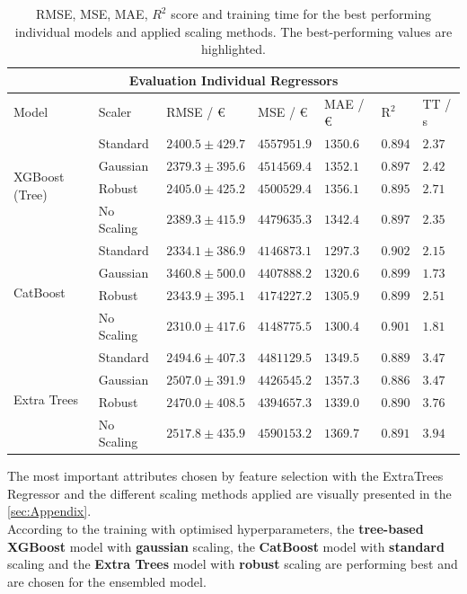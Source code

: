 \begin{table}[h!]
    \centering
      \begin{tabular}{ |p{2cm}||p{2cm}||p{2.9cm}|p{1.9cm}|p{1.7cm}|p{1cm}|p{1.2cm}|  }
        \hline
        \multicolumn{7}{|c|}{Evaluation Individual Regressors} \\
        \hline
        Model & Scaler & RMSE / €  & MSE / €  & MAE / € & $ \mathrm{R}^2 $& TT / s\\
        \hline
        \multirow{4}{2cm}{XGBoost (Tree)} & Standard & $2400.5 \pm  429.7$ & $4557951.9$ & $1350.6$ & $0.894$ & $2.37$\\
        & \cellcolor[HTML]{FFFACD} Gaussian  & \cellcolor[HTML]{FFFACD} $2379.3 \pm  395.6$ & $4514569.4$ & \cellcolor[HTML]{FFFACD} $1352.1$ & \cellcolor[HTML]{FFFACD} $0.897$ & $2.42$\\
        & Robust & $2405.0 \pm  425.2$ & $4500529.4$ & $1356.1$ & $0.895$ & $2.71$\\
        & No Scaling & $2389.3 \pm  415.9$ & $4479635.3$ & $1342.4$ & $0.897$ & $2.35$\\
        \hline   
        \multirow{4}{2cm}{CatBoost} & \cellcolor[HTML]{98FB98} Standard & \cellcolor[HTML]{FFFACD} $2334.1 \pm  386.9$ & $4146873.1$ & \cellcolor[HTML]{FFFACD} $1297.3$ & \cellcolor[HTML]{FFFACD} $0.902$ & $2.15$\\
        & Gaussian  & $3460.8 \pm  500.0$ & $4407888.2$ & $1320.6$ & $0.899$ & $1.73$\\
        & Robust & $2343.9 \pm 395.1$ & $4174227.2$ & $1305.9$ & $0.899$ & $2.51$\\
        & No Scaling & $2310.0 \pm  417.6$ & $4148775.5$ & $1300.4$ & $0.901$ & $1.81$\\
        \hline   
        \multirow{4}{2cm}{Extra Trees} & Standard & $2494.6 \pm  407.3$ & $4481129.5$ & $1349.5$ & $0.889$ & $3.47$\\
        & Gaussian  & $2507.0 \pm  391.9$ & $4426545.2$ & $1357.3$ & $0.886$ & $3.47$\\
        & \cellcolor[HTML]{FFFACD} Robust & \cellcolor[HTML]{FFFACD} $2470.0 \pm 408.5$ & $4394657.3$ & \cellcolor[HTML]{FFFACD}$1339.0$ & \cellcolor[HTML]{FFFACD}$0.890$ & $3.76$\\
        & No Scaling & $2517.8 \pm  435.9$ & $4590153.2$ & $1369.7$ & $0.891$ & $3.94$\\
        \hline
      \end{tabular}
      \caption{RMSE, MSE, MAE, $R^2$ score and training time for the best performing individual models and applied scaling methods. The best-performing values are highlighted.}
      \label{tab:Metrics}
\end{table}
The most important attributes chosen by feature selection with the ExtraTrees Regressor and the different scaling methods applied are 
visually presented in the \autoref{sec:Appendix}.\\
According to the training with optimised hyperparameters, the \textbf{tree-based XGBoost} model with
\textbf{gaussian} scaling, the \textbf{CatBoost} model with \textbf{standard} scaling and the \textbf{Extra Trees} model with \textbf{robust} scaling are performing best and are
chosen for the ensembled model.

